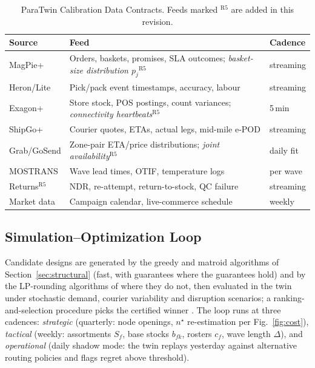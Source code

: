 \documentclass[10pt,twocolumn,letterpaper]{article}
\theoremstyle{definition}
\begin{document}
\begin{table}[t]
\caption{ParaTwin Calibration Data Contracts. Feeds marked $^{\mathrm{R5}}$ are added in this revision.}
\label{tab:contracts}
\centering\footnotesize
\begin{tabular}{@{}p{1.5cm}p{4.4cm}p{1.4cm}@{}}
\toprule
\textbf{Source} & \textbf{Feed} & \textbf{Cadence}\\
\midrule
MagPie+ & Orders, baskets, promises, SLA outcomes; \emph{basket-size distribution $p_j$}$^{\mathrm{R5}}$ & streaming\\
Heron/Lite & Pick/pack event timestamps, accuracy, labour & streaming\\
Exagon+ & Store stock, POS postings, count variances; \emph{connectivity heartbeats}$^{\mathrm{R5}}$ & 5\,min\\
ShipGo+ & Courier quotes, ETAs, actual legs, mid-mile e-POD & streaming\\
Grab/GoSend & Zone-pair ETA/price distributions; \emph{joint availability}$^{\mathrm{R5}}$ & daily fit\\
MOSTRANS & Wave lead times, OTIF, temperature logs & per wave\\
Returns$^{\mathrm{R5}}$ & NDR, re-attempt, return-to-stock, QC failure & streaming\\
Market data & Campaign calendar, live-commerce schedule & weekly\\
\bottomrule
\end{tabular}
\end{table}

\subsection{Simulation--Optimization Loop}
Candidate designs are generated by the greedy and matroid algorithms of Section~\ref{sec:structural} (fast, with guarantees where the guarantees hold) and by the LP-rounding algorithms of \cite{chekuri2004,fleischer2011} where they do not, then evaluated in the twin under stochastic demand, courier variability and disruption scenarios; a ranking-and-selection procedure picks the certified winner \cite{snoeck2022,law2015}. The loop runs at three cadences: \emph{strategic} (quarterly: node openings, $n^\star$ re-estimation per Fig.~\ref{fig:cost}), \emph{tactical} (weekly: assortments $S_f$, base stocks $b_{fk}$, rosters $c_f$, wave length $\Delta$), and \emph{operational} (daily shadow mode: the twin replays yesterday against alternative routing policies and flags regret above threshold).
\end{document}
